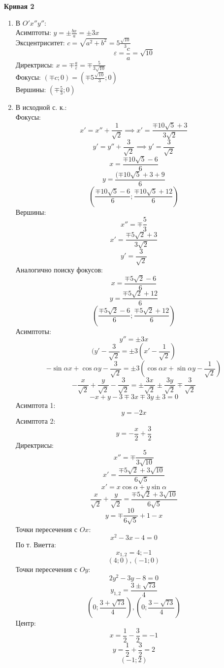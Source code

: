 \documentclass{article}
\theoremstyle{plain}
\begin{document}
\begin{enumerate}
\begin{enumerate}
    \end{enumerate}
    \textbf{Кривая 2}
    \begin{enumerate}
        \item В $O'x''y''$:\\
        Асимптоты: $y = \pm \frac{bx}{a} = \pm 3x$\\
        \vspace{2mm}
        Эксцентриситет: $c = \sqrt{a^2 + b^2} = 5\frac{\sqrt{10}}{3}$
        $$\varepsilon = \frac{c}{a} = \sqrt{10}$$
        \vspace{2mm}
        Директрисы: $x = \mp \frac{a}{\varepsilon} = \mp \frac{5}{3\sqrt{10}}$\\
        \vspace{2mm}
        Фокусы: $(\mp c; 0) = (\mp 5\frac{\sqrt{10}}{3}; 0)$\\
        \vspace{2mm}
        Вершины: $(\mp \frac{5}{3}; 0)$\\
        \item В исходной с. к.:\\
        Фокусы:
        $$x' = x'' + \frac{1}{\sqrt{2}} \implies x' = \frac{\mp 10\sqrt{5} + 3}{3\sqrt{2}}$$
        $$y' = y'' + \frac{3}{\sqrt{2}} \implies y' = \frac{3}{\sqrt{2}}$$
        $$ x = \frac{\mp 10\sqrt{5} - 6}{6} $$
        $$y = \frac{(\mp 10\sqrt{5} + 3 + 9}{6}$$
        $$(\frac{\mp10\sqrt{5} - 6}{6}; \frac{\mp 10\sqrt{5} + 12}{6})$$
        Вершины:
        $$ x'' = \mp \frac{5}{3}$$
        $$ x' = \frac{\mp5\sqrt{2} + 3}{3\sqrt{2}}$$
        $$y' = \frac{3}{\sqrt{2}}$$
        Аналогично поиску фокусов:
        $$x = \frac{\mp5\sqrt{2} - 6}{6}$$
        $$y = \frac{\mp 5\sqrt{2} + 12}{6}$$
        $$( \frac{\mp5\sqrt{2} - 6}{6}; \frac{\mp 5\sqrt{2} + 12}{6})$$
        Асимптоты:
        $$y'' = \pm 3x$$
        $$(y' - \frac{3}{\sqrt{2}} = \pm 3(x' - \frac{1}{\sqrt{2}})$$
        $$-\sin{\alpha}x + \cos{\alpha}y - \frac{3}{\sqrt{2}} = \pm 3( \cos{\alpha}x + \sin{\alpha}y - \frac{1}{\sqrt{2}})$$
        $$-\frac{x}{\sqrt{2}} + \frac{y}{\sqrt{2}} - \frac{3}{\sqrt{2}} = \pm \frac{3x}{\sqrt{2}} \pm \frac{3y}{\sqrt{2}} \mp \frac{3}{\sqrt{2}}$$
        $$ -x + y - 3 \mp 3x \mp 3y \pm 3 = 0$$
        Асимптота 1:
        $$y = -2x$$
        Асимптота 2:
        $$ y = -\frac{x}{2} + \frac{3}{2} $$
        Директрисы:
        $$ x'' = \mp \frac{5}{3\sqrt{10}} $$
        $$x' = \frac{\mp 5\sqrt{2} + 3\sqrt{10}}{6\sqrt{5}}$$
        $$x' = x\cos{\alpha} + y\sin{\alpha}$$
        $$\frac{x}{\sqrt{2}} + \frac{y}{\sqrt{2}} = \frac{\mp 5\sqrt{2} + 3\sqrt{10}}{6\sqrt{5}}$$
        $$y = \mp \frac{10}{6\sqrt{5}} + 1 - x$$
        Точки пересечения с $Ox$:
        $$ x^2 - 3x - 4 = 0$$
        По т. Виетта:
        $$x_{1, 2} = 4; -1$$
        $$(4; 0), (-1; 0) $$
        Точки пересечения с $Oy$:
        $$ 2y^2 - 3y - 8 = 0$$
        $$y_{1, 2} = \frac{3 \pm \sqrt{73}}{4}$$ 
        $$(0; \frac{3 + \sqrt{73}}{4}), (0; \frac{3 - \sqrt{73}}{4})  $$
        Центр: 
        $$ x = \frac{1}{2} - \frac{3}{2} = -1$$
        $$y = \frac{1}{2} + \frac{3}{2} = 2$$
        $$(-1; 2)$$
    \end{enumerate}
    
\end{enumerate}
\newpage
\end{document}
